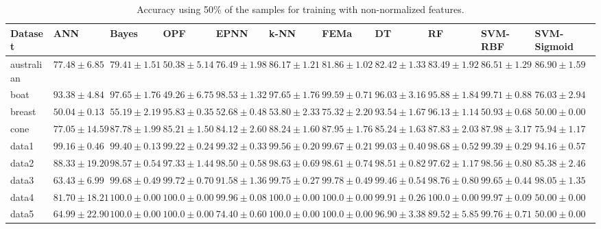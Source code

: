 \begin{sidewaystable}
\centering
\caption{\label{tab.ACC_0}Accuracy using 50\% of the samples for training with non-normalized features.}
\scriptsize
\begin{tabular}{l||l|l|l|l|l|l|l|l|l|l|}
Dataset & ANN & Bayes & OPF & EPNN & k-NN & FEMa & DT & RF &SVM-RBF & SVM-Sigmoid \\ \hline
australian& $77.48\pm6.85$& $79.41\pm1.51$& $50.38\pm5.14$& $76.49\pm1.98$& $\mathbf{86.17\pm1.21}$& $81.86\pm1.02$& $82.42\pm1.33$& $83.49\pm1.92$& $\mathbf{86.51\pm1.29}$& $\mathbf{86.90\pm1.59}$\\ 
boat& $93.38\pm4.84$& $97.65\pm1.76$& $49.26\pm6.75$& $98.53\pm1.32$& $97.65\pm1.76$& $\mathbf{99.59\pm0.71}$& $96.03\pm3.16$& $95.88\pm1.84$& $\mathbf{99.71\pm0.88}$& $76.03\pm2.94$\\ 
breast& $50.04\pm0.13$& $55.19\pm2.19$& $95.83\pm0.35$& $52.68\pm0.48$& $53.80\pm2.33$& $75.32\pm2.20$& $93.54\pm1.67$& $\mathbf{96.13\pm1.14}$& $50.93\pm0.68$& $50.00\pm0.00$\\ 
cone& $77.05\pm14.59$& $\mathbf{87.78\pm1.99}$& $85.21\pm1.50$& $84.12\pm2.60$& $\mathbf{88.24\pm1.60}$& $\mathbf{87.95\pm1.76}$& $85.24\pm1.63$& $\mathbf{87.83\pm2.03}$& $\mathbf{87.98\pm3.17}$& $75.94\pm1.17$\\ 
data1& $99.16\pm0.46$& $99.40\pm0.13$& $99.22\pm0.24$& $99.32\pm0.33$& $\mathbf{99.56\pm0.20}$& $\mathbf{99.67\pm0.21}$& $99.03\pm0.40$& $\mathbf{98.68\pm0.52}$& $99.39\pm0.29$& $94.16\pm0.57$\\ 
data2& $88.33\pm19.20$& $\mathbf{98.57\pm0.54}$& $97.33\pm1.44$& $\mathbf{98.50\pm0.58}$& $\mathbf{98.63\pm0.69}$& $\mathbf{98.61\pm0.74}$& $\mathbf{98.51\pm0.82}$& $97.62\pm1.17$& $\mathbf{98.56\pm0.80}$& $85.38\pm2.46$\\ 
data3& $63.43\pm6.99$& $\mathbf{99.68\pm0.49}$& $\mathbf{99.72\pm0.70}$& $91.58\pm1.36$& $\mathbf{99.75\pm0.27}$& $\mathbf{99.78\pm0.49}$& $99.46\pm0.54$& $98.76\pm0.80$& $\mathbf{99.65\pm0.44}$& $98.05\pm1.35$\\ 
data4& $81.70\pm18.21$& $\mathbf{100.0\pm0.00}$& $\mathbf{100.0\pm0.00}$& $99.96\pm0.08$& $\mathbf{100.0\pm0.00}$& $\mathbf{100.0\pm0.00}$& $99.91\pm0.26$& $\mathbf{100.0\pm0.00}$& $99.97\pm0.09$& $50.00\pm0.00$\\ 
data5& $64.99\pm22.90$& $\mathbf{100.0\pm0.00}$& $\mathbf{100.0\pm0.00}$& $74.40\pm0.60$& $\mathbf{100.0\pm0.00}$& $\mathbf{100.0\pm0.00}$& $96.90\pm3.38$& $89.52\pm5.85$& $99.76\pm0.71$& $50.00\pm0.00$\\ 

\end{tabular}
\end{sidewaystable}
